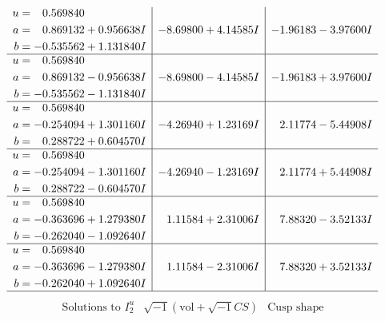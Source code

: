 \documentclass[1p]{elsarticle_modified}
\theoremstyle{definition}
\newcommand{\I}{\sqrt{-1}}
\begin{document}
$$\begin{array}{c|c|c}
\begin{aligned}
u &= \phantom{-}0.569840\phantom{ +0.000000I} \\
a &= \phantom{-}0.869132 + 0.956638 I \\
b &= -0.535562 + 1.131840 I\end{aligned}
 & -8.69800 + 4.14585 I & -1.96183 - 3.97600 I \\ \hline\begin{aligned}
u &= \phantom{-}0.569840\phantom{ +0.000000I} \\
a &= \phantom{-}0.869132 - 0.956638 I \\
b &= -0.535562 - 1.131840 I\end{aligned}
 & -8.69800 - 4.14585 I & -1.96183 + 3.97600 I \\ \hline\begin{aligned}
u &= \phantom{-}0.569840\phantom{ +0.000000I} \\
a &= -0.254094 + 1.301160 I \\
b &= \phantom{-}0.288722 + 0.604570 I\end{aligned}
 & -4.26940 + 1.23169 I & \phantom{-}2.11774 - 5.44908 I \\ \hline\begin{aligned}
u &= \phantom{-}0.569840\phantom{ +0.000000I} \\
a &= -0.254094 - 1.301160 I \\
b &= \phantom{-}0.288722 - 0.604570 I\end{aligned}
 & -4.26940 - 1.23169 I & \phantom{-}2.11774 + 5.44908 I \\ \hline\begin{aligned}
u &= \phantom{-}0.569840\phantom{ +0.000000I} \\
a &= -0.363696 + 1.279380 I \\
b &= -0.262040 - 1.092640 I\end{aligned}
 & \phantom{-}1.11584 + 2.31006 I & \phantom{-}7.88320 - 3.52133 I \\ \hline\begin{aligned}
u &= \phantom{-}0.569840\phantom{ +0.000000I} \\
a &= -0.363696 - 1.279380 I \\
b &= -0.262040 + 1.092640 I\end{aligned}
 & \phantom{-}1.11584 - 2.31006 I & \phantom{-}7.88320 + 3.52133 I\\
 \hline 
 \end{array}$$\newpage$$\begin{array}{c|c|c}  
\text{Solutions to }I^u_{2}& \I (\text{vol} + \sqrt{-1}CS) & \text{Cusp shape}\\

\end{array}$$
\end{document}
